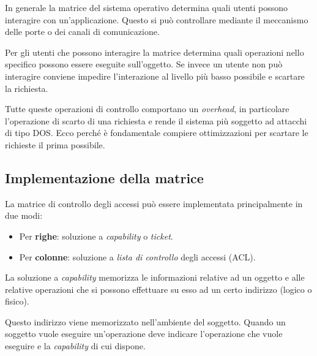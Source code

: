 In generale la matrice del sistema operativo determina quali utenti possono interagire con un'applicazione. Questo si
può controllare mediante il meccanismo delle porte o dei canali di comunicazione.

Per gli utenti che possono interagire la matrice determina quali operazioni nello specifico possono essere eseguite
sull'oggetto. Se invece un utente non può interagire conviene impedire l'interazione al livello più basso possibile
e scartare la richiesta.

Tutte queste operazioni di controllo comportano un \emph{overhead}, in particolare l'operazione di scarto di una
richiesta e rende il sistema più soggetto ad attacchi di tipo DOS. Ecco perché è fondamentale compiere ottimizzazioni
per scartare le richieste il prima possibile.

\subsection{Implementazione della matrice}
La matrice di controllo degli accessi può essere implementata principalmente in due modi:
\begin{itemize}
	\item Per \textbf{righe}: soluzione a \emph{capability} o \emph{ticket}.
	\item Per \textbf{colonne}: soluzione a \emph{lista di controllo} degli accessi (ACL).
\end{itemize}
La soluzione a \emph{capability} memorizza le informazioni relative ad un oggetto e alle relative operazioni che si
possono effettuare su esso ad un certo indirizzo (logico o fisico).

Questo indirizzo viene memorizzato nell'ambiente del soggetto. Quando un soggetto vuole eseguire un'operazione deve
indicare l'operazione che vuole eseguire e la \emph{capability} di cui dispone.